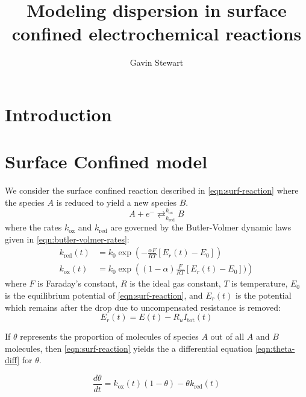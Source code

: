 \documentclass[twocolumn]{article}
\title{Modeling dispersion in surface confined electrochemical reactions}
\author{Gavin Stewart}
\newcommand{\kOx}{\ensuremath{k_{\mathrm{ox}}}}
\newcommand{\kRed}{\ensuremath{k_\mathrm{red}}}
\begin{document}
	
	\maketitle
	
	\section{Introduction}
	
	\section{Surface Confined model}
	We consider the surface confined reaction described in \cref{eqn:surf-reaction} where the species $A$ is reduced to yield a new species $B$.
	\begin{equation}\label{eqn:surf-reaction}
		A + e^- \mathop{\rightleftarrows}^{\kOx}_{\kRed} B
	\end{equation}
	where the rates $\kOx$ and $\kRed$ are governed by the Butler-Volmer dynamic laws given in \cref{eqn:butler-volmer-rates}:
	\begin{equation} \label{eqn:butler-volmer-rates}
		\begin{aligned}
			\kRed(t) &= k_0 \exp\left(-\frac{\alpha F}{RT}[E_r(t) - E_0]\right)\\
			\kOx(t) &= k_0 \exp\left((1-\alpha) \frac{F}{RT}[E_r(t) - E_0])\right)
		\end{aligned}
	\end{equation}
	where $F$ is Faraday's constant, $R$ is the ideal gas constant, $T$ is temperature, $E_0$ is the equilibrium potential of \cref{eqn:surf-reaction}, and $E_r(t)$ is the potential which remains after the drop due to uncompensated resistance is removed:
	\begin{equation}
		E_r(t) = E(t) - R_u I_{\mathrm{tot}}(t)
	\end{equation}
	
	If $\theta$ represents the proportion of molecules of species $A$ out of all $A$ and $B$ molecules, then  \cref{eqn:surf-reaction} yields the a differential equation \ref{eqn:theta-diff} for $\theta$.
	
	\begin{equation} \label{eqn:theta-diff}
		\frac{d\theta}{dt} = \kOx(t)(1-\theta) - \theta \kRed(t)
	\end{equation}
	
\end{document}

